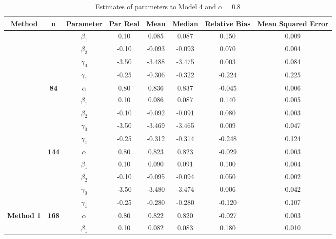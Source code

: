 \begin{table}[h]

\caption{\label{tab:Est_model_4_Alpha0.8}Estimates of parameters to Model 4 and $\alpha=0.8$}
\centering
\begin{tabular}[t]{>{}c>{}ccccccc}
\toprule
Method & n & Parameter & Par Real & Mean & Median & Relative Bias & Mean Squared Error\\
\midrule
 &  & $\beta_1$ & 0.10 & 0.085 & 0.087 & 0.150 & 0.009\\

 &  & $\beta_2$ & -0.10 & -0.093 & -0.093 & 0.070 & 0.004\\

 &  & $\gamma_0$ & -3.50 & -3.488 & -3.475 & 0.003 & 0.084\\

 &  & $\gamma_1$ & -0.25 & -0.306 & -0.322 & -0.224 & 0.225\\

 & \multirow{-5}{*}{\centering\arraybackslash \textbf{84}} & $\alpha$ & 0.80 & 0.836 & 0.837 & -0.045 & 0.006\\

 &  & $\beta_1$ & 0.10 & 0.086 & 0.087 & 0.140 & 0.005\\

 &  & $\beta_2$ & -0.10 & -0.092 & -0.091 & 0.080 & 0.003\\

 &  & $\gamma_0$ & -3.50 & -3.469 & -3.465 & 0.009 & 0.047\\

 &  & $\gamma_1$ & -0.25 & -0.312 & -0.314 & -0.248 & 0.124\\

 & \multirow{-5}{*}{\centering\arraybackslash \textbf{144}} & $\alpha$ & 0.80 & 0.823 & 0.823 & -0.029 & 0.003\\

 &  & $\beta_1$ & 0.10 & 0.090 & 0.091 & 0.100 & 0.004\\

 &  & $\beta_2$ & -0.10 & -0.095 & -0.094 & 0.050 & 0.002\\

 &  & $\gamma_0$ & -3.50 & -3.480 & -3.474 & 0.006 & 0.042\\

 &  & $\gamma_1$ & -0.25 & -0.280 & -0.280 & -0.120 & 0.107\\

\multirow{-15}{*}{\centering\arraybackslash \textbf{Method 1}} & \multirow{-5}{*}{\centering\arraybackslash \textbf{168}} & $\alpha$ & 0.80 & 0.822 & 0.820 & -0.027 & 0.003\\
\cmidrule{1-8}
 &  & $\beta_1$ & 0.10 & 0.082 & 0.083 & 0.180 & 0.010\\


\end{tabular}
\end{table}
